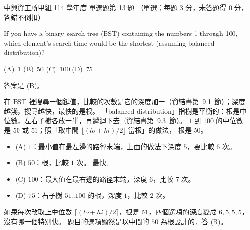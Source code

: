 \begin{pastexam}[label={px:nchu-114-dsa-13}]{中興資工所甲組 114 學年度 單選題第 13 題}
（單選；每題 3 分，未答題得 0 分，答錯不倒扣）

If you have a binary search tree (BST) containing the numbers 1 through 100, which element's search time would be the shortest (assuming balanced distribution)?

(A)~1 \qquad (B)~50 \qquad (C)~100 \qquad (D)~75
\end{pastexam}

\begin{pastsoln}
答案是 (B)。

在 BST 裡搜尋一個鍵值，比較的次數是它的深度加一（資結書第~9.1~節）；深度越淺，搜尋越快，最快的是根。
「balanced distribution」指樹是平衡的：根是中位數，左右子樹各放一半，再遞迴下去（資結書第~9.3~節）。
$1$ 到 $100$ 的中位數是 $50$ 或 $51$；照「取中間 $\lfloor (\mathit{lo} + \mathit{hi})/2 \rfloor$ 當根」的做法，
根是 $50$。
\begin{itemize}
\item (A) $1$：最小值在最左邊的路徑末端，上面的做法下深度 $5$，要比較 $6$ 次。
\item (B) $50$：根，比較 $1$ 次。 最快。
\item (C) $100$：最大值在最右邊的路徑末端，深度 $6$，比較 $7$ 次。
\item (D) $75$：右子樹 $51..100$ 的根，深度 $1$，比較 $2$ 次。
\end{itemize}
如果每次改取上中位數 $\lceil (\mathit{lo} + \mathit{hi})/2 \rceil$，根是 $51$，四個選項的深度變成
$6, 5, 5, 5$，沒有哪一個特別快。 題目的選項顯然是以中間的 $50$ 為根設計的，答 (B)。
\end{pastsoln}
